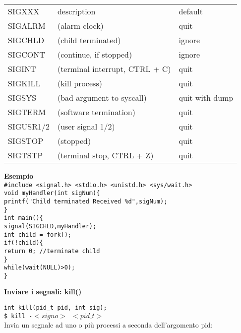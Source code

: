 \begin{flushleft}
  \begin{flushleft}
    \begin{tabular}{lll}
      SIGXXX & description & default\\
      SIGALRM & (alarm clock) & quit\\
      SIGCHLD & (child terminated) & ignore\\
      SIGCONT & (continue, if stopped) & ignore\\
      SIGINT & (terminal interrupt, CTRL + C)& quit\\
      SIGKILL & (kill process) &quit\\
      SIGSYS & (bad argument to syscall) & quit with dump\\
      SIGTERM & (software termination) & quit\\
      SIGUSR1/2 & (user signal 1/2) & quit\\
      SIGSTOP & (stopped) & quit\\
      SIGTSTP & (terminal stop, CTRL + Z) & quit\\
    \end{tabular}
  \end{flushleft}
  \begin{flushleft}
    \textbf{Esempio}\\
    \texttt{\#include <signal.h> <stdio.h> <unistd.h> <sys/wait.h> \\
    void myHandler(int sigNum)\{\\
    \halftab printf("Child terminated Received \%d\n",sigNum);\\
    \} \\
    int main()\{ \\
    \halftab signal(SIGCHLD,myHandler);\\
    \halftab int child = fork();\\
    \halftab if(!child)\{\\
    \tab return 0; //terminate child\\
    \halftab \} \\
    \halftab while(wait(NULL)>0);\\
    \}}
  \end{flushleft}
  \begin{flushleft}
    \textbf{Inviare i segnali: kill()}\par 
    \texttt{int kill(pid\_t pid, int sig);}\\
    \texttt{\$ kill -$<signo>$ $<pid\_t>$} \\
    Invia un segnale ad uno o più processi a seconda dell'argomento pid:

\end{flushleft}
\end{flushleft}
